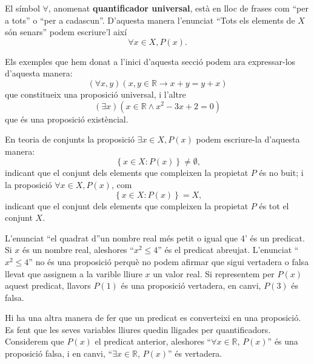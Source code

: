 El símbol $\forall$, anomenat \textbf{quantificador universal}, està
en lloc de frases com \enquote{per a tots} o \enquote{per a cadascun}. D'aquesta manera
l'enunciat \enquote{Tots els elements de $X$ són senars} podem escriure'l així\begin{equation*}
\forall x\in X,P(x)\text{.}
\end{equation*}

\bigskip

Els exemples que hem donat a l'inici d'aquesta secció podem ara
expressar-los d'aquesta manera:
\begin{equation*}
\left( \forall x,y\right) \left( x,y\in\mathbb{R}\longrightarrow
x+y=y+x\right)
\end{equation*}
que constitueix una proposició universal, i l'altre\begin{equation*}
\left( \exists x\right) \left( x\in\mathbb{R}\wedge x^{2}-3x+2=0\right)
\end{equation*}
que és una proposició existèncial.

\begin{observacio}
En teoria de conjunts la proposició $\exists x\in X,P(x)$ podem
escriure-la d'aquesta manera:\begin{equation*}
\left\{ x\in X:P(x)\right\} \neq\emptyset\text{,}
\end{equation*}
indicant que el conjunt dels elements que compleixen la propietat $P$ és
no buit; i la proposició $\forall x\in X,P(x)$, com\begin{equation*}
\left\{ x\in X:P(x)\right\} =X\text{,}
\end{equation*}
indicant que el conjunt dels elements que compleixen la propietat $P$ és
tot el conjunt $X$.
\end{observacio}

\bigskip

L'enunciat \enquote{el quadrat d}un nombre real més petit o igual que 4' és
un predicat. Si $x$ és un nombre real, aleshores \enquote{$x^{2}\leq4$} és
el predicat abreujat. L'enunciat \enquote{$x^{2}\leq4$} no és una proposició
perquè no podem afirmar que sigui vertadera o falsa llevat que assignem
a la varible lliure $x$ un valor real. Si representem per $P(x)$ aquest
predicat, llavors $P(1)$ és una proposició vertadera, en canvi, $P(3) $ és falsa.

Hi ha una altra manera de fer que un predicat es converteixi en una proposició. Es fent que les seves variables lliures quedin lligades per
quantificadors. Considerem que $P(x)$ el predicat anterior, aleshores \enquote{$\forall x\in\mathbb{R}$, $P(x)$} és una proposició falsa, i en
canvi, \enquote{$\exists x\in\mathbb{R}$, $P(x)$} és vertadera.

